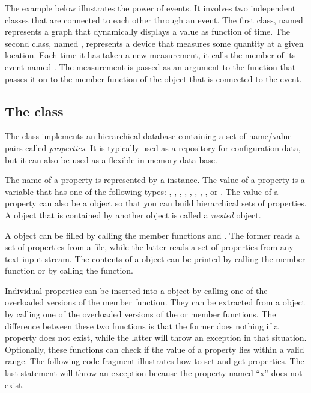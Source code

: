 The example below illustrates the power of events. It involves two
independent classes that are connected to each other through an event.
The first class, named  represents a graph that dynamically
displays a value as function of time. The second class, named
, represents a device that measures some quantity at a given
location. Each time it has taken a new measurement, it calls the
 member of its event named . The
measurement is passed as an argument to the  function that
passes it on to the member function  of the 
object that is connected to the event.



\subsection*{The  class}

The  class implements an hierarchical database
containing a set of name/value pairs called \emph{properties}. It is
typically used as a repository for configuration data, but it can also be
used as a flexible in-memory data base.

The name of a property is represented by a  instance. The
value of a property is a variable that has one of the following types:
, , , ,
, , ,
, or . The value of a property can also
be a  object so that you can build hierarchical sets of
properties. A  object that is contained by another
 object is called a \emph{nested} 
object.

A  object can be filled by calling the member functions
 and . The former reads a set of
properties from a file, while the latter reads a set of properties from
any text input stream. The contents of a  object can be
printed by calling the member function  or by calling the
 function.

Individual properties can be inserted into a  object by
calling one of the overloaded versions of the  member
function. They can be extracted from a  object by
calling one of the overloaded versions of the  or
 member functions. The difference between these two functions
is that the former does nothing if a property does not exist, while the
latter will throw an exception in that situation. Optionally, these
functions can check if the value of a property lies within a valid range.
The following code fragment illustrates how to set and get properties.
The last statement will throw an exception because the property named
``x'' does not exist.

